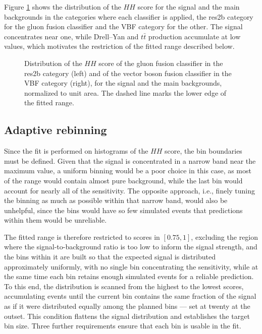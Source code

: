 Figure \ref{fig:dnn_output} shows the distribution of the $HH$ score for the signal and the main backgrounds in the categories where each classifier is applied, the res2b category for the gluon fusion classifier and the VBF category for the other. The signal concentrates near one, while Drell--Yan and $t\bar{t}$ production accumulate at low values, which motivates the restriction of the fitted range described below.
%
\begin{figure}[tbp]
    \centering
    \hfill
    \caption[Distribution of the $HH$ score]{%
        Distribution of the $HH$ score of the gluon fusion classifier in the res2b category
        (left) and of the vector boson fusion classifier in the VBF category (right), for the
        signal and the main backgrounds, normalized to unit area. The dashed line marks the
        lower edge of the fitted range.}
    \label{fig:dnn_output}
\end{figure}


\subsection{Adaptive rebinning}
\label{subsec:bbtt_rebinning}
%
Since the fit is performed on histograms of the $HH$ score, the bin boundaries must be defined. Given that the signal is concentrated in a narrow band near the maximum value, a uniform binning would be a poor choice in this case, as most of the range would contain almost pure background, while the last bin would account for nearly all of the sensitivity. The opposite approach, i.e., finely tuning the binning as much as possible within that narrow band, would also be unhelpful, since the bins would have so few simulated events that predictions within them would be unreliable.

The fitted range is therefore restricted to scores in $[0.75, 1]$, excluding the region where the signal-to-background ratio is too low to inform the signal strength, and the bins within it are built so that the expected signal is distributed approximately uniformly, with no single bin concentrating the sensitivity, while at the same time each bin retains enough simulated events for a reliable prediction. To this end, the distribution is scanned from the highest to the lowest scores, accumulating events until the current bin contains the same fraction of the signal as if it were distributed equally among the planned bins — set at twenty at the outset. This condition flattens the signal distribution and establishes the target bin size. Three further requirements ensure that each bin is usable in the fit.

